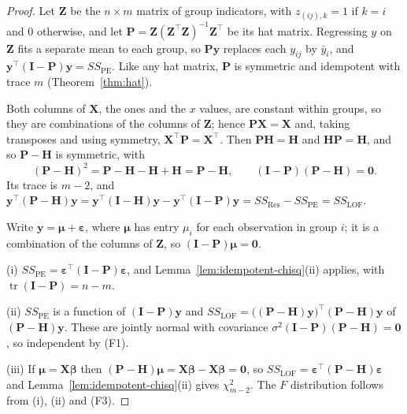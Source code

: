 \documentclass[11pt,a4paper]{article}
\numberwithin{equation}{section}
\theoremstyle{definition}
\begin{document}
\begin{proof}
Let $\mathbf{Z}$ be the $n \times m$ matrix of group indicators, with $z_{(ij),k} = 1$ if
$k = i$ and $0$ otherwise, and let $\mathbf{P} = \mathbf{Z}(\mathbf{Z}^\top\mathbf{Z})^{-1}\mathbf{Z}^\top$
be its hat matrix. Regressing $y$ on $\mathbf{Z}$ fits a separate mean to each group, so
$\mathbf{Py}$ replaces each $y_{ij}$ by $\bar y_i$, and $\mathbf{y}^\top(\mathbf{I} - \mathbf{P})\mathbf{y} = SS_{\mathrm{PE}}$.
Like any hat matrix, $\mathbf{P}$ is symmetric and idempotent with trace $m$
(Theorem~\ref{thm:hat}).

Both columns of $\mathbf{X}$, the ones and the $x$ values, are constant within groups, so
they are combinations of the columns of $\mathbf{Z}$; hence $\mathbf{PX} = \mathbf{X}$ and,
taking transposes and using symmetry, $\mathbf{X}^\top\mathbf{P} = \mathbf{X}^\top$. Then
$\mathbf{PH} = \mathbf{H}$ and $\mathbf{HP} = \mathbf{H}$, and so $\mathbf{P} - \mathbf{H}$
is symmetric, with
\[
(\mathbf{P} - \mathbf{H})^2 = \mathbf{P} - \mathbf{H} - \mathbf{H} + \mathbf{H} = \mathbf{P} - \mathbf{H},
\qquad
(\mathbf{I} - \mathbf{P})(\mathbf{P} - \mathbf{H}) = \mathbf{0} .
\]
Its trace is $m - 2$, and
$\mathbf{y}^\top(\mathbf{P} - \mathbf{H})\mathbf{y} = \mathbf{y}^\top(\mathbf{I} - \mathbf{H})\mathbf{y} - \mathbf{y}^\top(\mathbf{I} - \mathbf{P})\mathbf{y}
= SS_{\mathrm{Res}} - SS_{\mathrm{PE}} = SS_{\mathrm{LOF}}$.

Write $\mathbf{y} = \boldsymbol\mu + \boldsymbol\varepsilon$, where $\boldsymbol\mu$ has entry
$\mu_i$ for each observation in group $i$; it is a combination of the columns of
$\mathbf{Z}$, so $(\mathbf{I} - \mathbf{P})\boldsymbol\mu = \mathbf{0}$.

(i) $SS_{\mathrm{PE}} = \boldsymbol\varepsilon^\top(\mathbf{I} - \mathbf{P})\boldsymbol\varepsilon$,
and Lemma~\ref{lem:idempotent-chisq}(ii) applies, with $\operatorname{tr}(\mathbf{I} - \mathbf{P}) = n - m$.

(ii) $SS_{\mathrm{PE}}$ is a function of $(\mathbf{I} - \mathbf{P})\mathbf{y}$ and
$SS_{\mathrm{LOF}} = \bigl((\mathbf{P} - \mathbf{H})\mathbf{y}\bigr)^\top(\mathbf{P} - \mathbf{H})\mathbf{y}$
of $(\mathbf{P} - \mathbf{H})\mathbf{y}$. These are jointly normal with covariance
$\sigma^2(\mathbf{I} - \mathbf{P})(\mathbf{P} - \mathbf{H}) = \mathbf{0}$, so independent by (F1).

(iii) If $\boldsymbol\mu = \mathbf{X}\boldsymbol\beta$ then
$(\mathbf{P} - \mathbf{H})\boldsymbol\mu = \mathbf{X}\boldsymbol\beta - \mathbf{X}\boldsymbol\beta = \mathbf{0}$,
so $SS_{\mathrm{LOF}} = \boldsymbol\varepsilon^\top(\mathbf{P} - \mathbf{H})\boldsymbol\varepsilon$
and Lemma~\ref{lem:idempotent-chisq}(ii) gives $\chi^2_{m - 2}$. The $F$ distribution
follows from (i), (ii) and (F3).
\end{proof}
\end{document}
